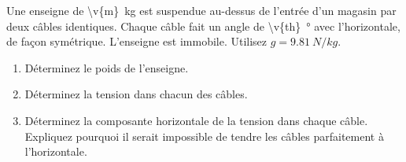 Une enseigne de \qty{\v{m}}{kg} est suspendue au-dessus de l'entrée d'un magasin par deux câbles identiques. Chaque câble fait un angle de \qty{\v{th}}{\degree} avec l'horizontale, de façon symétrique. L'enseigne est immobile. Utilisez $g = \qty{9.81}{N/kg}$.

\begin{center}
\end{center}

\begin{enumerate}[label=\alph*)]
    \item Déterminez le poids de l'enseigne.
    \item Déterminez la tension dans chacun des câbles.
    \item Déterminez la composante horizontale de la tension dans chaque câble. Expliquez pourquoi il serait impossible de tendre les câbles parfaitement à l'horizontale.
\end{enumerate}
